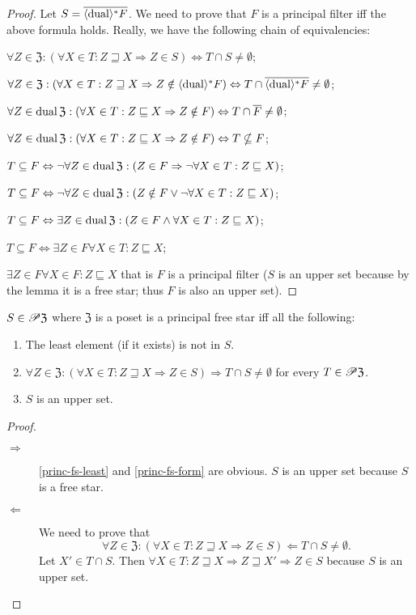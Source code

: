 \begin{proof}
Let $S=\overline{\langle\operatorname{dual}\rangle^{\ast}F}$. We need to prove
that $F$ is a principal filter iff the above formula holds. Really, we have the following chain
of equivalencies:

$\forall Z\in\mathfrak{Z}:(\forall X\in T:Z\sqsupseteq X\Rightarrow Z\in S)\Leftrightarrow T\cap S\neq\emptyset$;

$\forall Z\in\mathfrak{Z}:(\forall X\in T:Z\sqsupseteq X\Rightarrow Z\notin\langle\operatorname{dual}\rangle^{\ast}F)\Leftrightarrow T\cap\overline{\langle\operatorname{dual}\rangle^{\ast}F}\neq\emptyset$;

$\forall Z\in\operatorname{dual}\mathfrak{Z}:(\forall X\in T:Z\sqsubseteq X\Rightarrow Z\notin F)\Leftrightarrow T\cap\overline{F}\neq\emptyset$;

$\forall Z\in\operatorname{dual}\mathfrak{Z}:(\forall X\in T:Z\sqsubseteq X\Rightarrow Z\notin F)\Leftrightarrow T\nsubseteq F$;

$T\subseteq F\Leftrightarrow\neg\forall Z\in\operatorname{dual}\mathfrak{Z}:(Z\in F\Rightarrow\neg\forall X\in T:Z\sqsubseteq X)$;

$T\subseteq F\Leftrightarrow\neg\forall Z\in\operatorname{dual}\mathfrak{Z}:(Z\notin F\vee\neg\forall X\in T:Z\sqsubseteq X)$;

$T\subseteq F\Leftrightarrow\exists Z\in\operatorname{dual}\mathfrak{Z}:(Z\in F\wedge\forall X\in T:Z\sqsubseteq X)$;

$T\subseteq F\Leftrightarrow\exists Z\in F\forall X\in T:Z\sqsubseteq X$;

$\exists Z\in F\forall X\in F:Z\sqsubseteq X$ that is $F$ is a principal
filter ($S$ is an upper set because by the lemma it is a free star;
thus $F$ is also an upper set).\end{proof}
\begin{prop}
$S\in\mathscr{P}\mathfrak{Z}$ where $\mathfrak{Z}$ is a poset is a
principal free star iff all the following:
\begin{enumerate}
\item \label{princ-fs-least}The least element (if it exists) is not in
$S$.
\item \label{princ-fs-form}$\forall Z\in\mathfrak{Z}:(\forall X\in T:Z\sqsupseteq X\Rightarrow Z\in S)\Rightarrow T\cap S\neq\emptyset$
for every $T\in\mathscr{P}\mathfrak{Z}$.
\item $S$ is an upper set.
\end{enumerate}
\end{prop}
\begin{proof}
~
\begin{description}
\item [{$\Rightarrow$}] \ref{princ-fs-least} and \ref{princ-fs-form}
are obvious. $S$ is an upper set because $S$ is a free star.
\item [{$\Leftarrow$}] We need to prove that
\[
\forall Z\in\mathfrak{Z}:(\forall X\in T:Z\sqsupseteq X\Rightarrow Z\in S)\Leftarrow T\cap S\neq\emptyset.
\]
Let $X'\in T\cap S$. Then $\forall X\in T:Z\sqsupseteq X\Rightarrow Z\sqsupseteq X'\Rightarrow Z\in S$
because $S$ is an upper set.
\end{description}
\end{proof}
